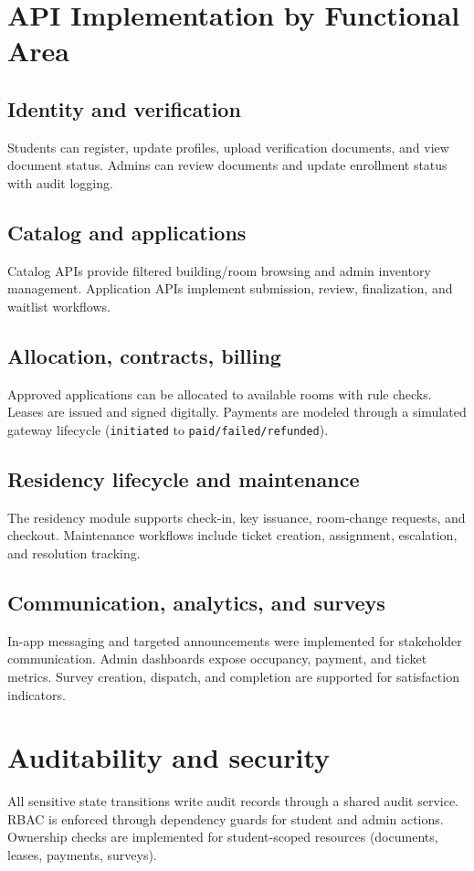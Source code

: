 \section{API Implementation by Functional Area}
\subsection{Identity and verification}
Students can register, update profiles, upload verification documents, and view document status. Admins can review documents and update enrollment status with audit logging.

\subsection{Catalog and applications}
Catalog APIs provide filtered building/room browsing and admin inventory management. Application APIs implement submission, review, finalization, and waitlist workflows.

\subsection{Allocation, contracts, billing}
Approved applications can be allocated to available rooms with rule checks. Leases are issued and signed digitally. Payments are modeled through a simulated gateway lifecycle (\texttt{initiated} to \texttt{paid/failed/refunded}).

\subsection{Residency lifecycle and maintenance}
The residency module supports check-in, key issuance, room-change requests, and checkout. Maintenance workflows include ticket creation, assignment, escalation, and resolution tracking.

\subsection{Communication, analytics, and surveys}
In-app messaging and targeted announcements were implemented for stakeholder communication. Admin dashboards expose occupancy, payment, and ticket metrics. Survey creation, dispatch, and completion are supported for satisfaction indicators.

\section{Auditability and security}
All sensitive state transitions write audit records through a shared audit service. RBAC is enforced through dependency guards for student and admin actions. Ownership checks are implemented for student-scoped resources (documents, leases, payments, surveys).

